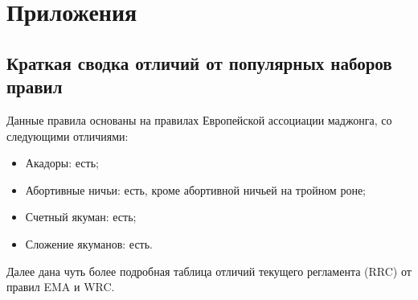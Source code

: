 \section{Приложения}

\subsection{Краткая сводка отличий от популярных наборов правил}

Данные правила основаны на правилах Европейской ассоциации маджонга, со следующими отличиями:

\begin{itemize}
	\item Акадоры: есть;
	\item Абортивные ничьи: есть, кроме абортивной ничьей на тройном роне;
	\item Счетный якуман: есть;
	\item Сложение якуманов: есть.
\end{itemize}

Далее дана чуть более подробная таблица отличий текущего регламента (RRC) от правил EMA и WRC.

